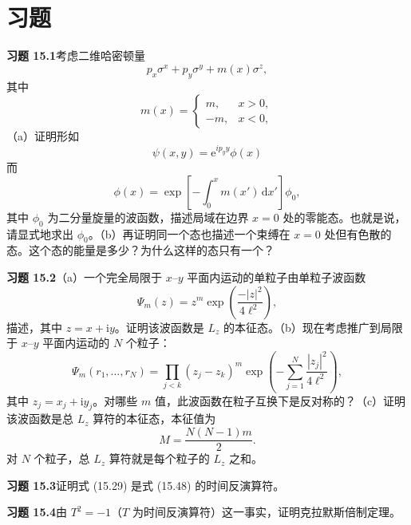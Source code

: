\section*{习题}

\textbf{习题 15.1}\quad 考虑二维哈密顿量
\begin{equation*}
p_{x}\sigma^{x}+p_{y}\sigma^{y}+m(x)\sigma^{z},\tag{15.96}
\end{equation*}
其中
\begin{equation*}
m(x)=\begin{cases}m, & x>0,\\ -m, & x<0,\end{cases}
\end{equation*}
（a）证明形如
\begin{equation*}
\psi(x,y)=\mathrm{e}^{ip_{y}y}\phi(x)\tag{15.97}
\end{equation*}
而
\begin{equation*}
\phi(x)=\exp\left[-\int_{0}^{x}m(x')\,\mathrm{d}x'\right]\phi_{0},\tag{15.98}
\end{equation*}
其中 $\phi_{0}$ 为二分量旋量的波函数，描述局域在边界 $x=0$ 处的零能态。也就是说，请显式地求出 $\phi_{0}$。（b）再证明同一个态也描述一个束缚在 $x=0$ 处但有色散的态。这个态的能量是多少？为什么这样的态只有一个？

\textbf{习题 15.2}\quad （a）一个完全局限于 $x$–$y$ 平面内运动的单粒子由单粒子波函数
\begin{equation*}
\Psi_{m}(z)=z^{m}\exp\left(\frac{-|z|^{2}}{4\ell^{2}}\right),\tag{15.99}
\end{equation*}
描述，其中 $z=x+\mathrm{i}y$。证明该波函数是 $L_{z}$ 的本征态。（b）现在考虑推广到局限于 $x$–$y$ 平面内运动的 $N$ 个粒子：
\begin{equation*}
\Psi_{m}(r_{1},\ldots,r_{N})=\prod_{j<k}(z_{j}-z_{k})^{m}\exp\left(-\sum_{j=1}^{N}\frac{|z_{j}|^{2}}{4\ell^{2}}\right),\tag{15.100}
\end{equation*}
其中 $z_{j}=x_{j}+\mathrm{i}y_{j}$。对哪些 $m$ 值，此波函数在粒子互换下是反对称的？（c）证明该波函数是总 $L_{z}$ 算符的本征态，本征值为
\begin{equation*}
M=\frac{N(N-1)m}{2}.\tag{15.101}
\end{equation*}
对 $N$ 个粒子，总 $L_{z}$ 算符就是每个粒子的 $L_{z}$ 之和。

\textbf{习题 15.3}\quad 证明式 (15.29) 是式 (15.48) 的时间反演算符。

\textbf{习题 15.4}\quad 由 $T^{2}=-1$（$T$ 为时间反演算符）这一事实，证明克拉默斯倍制定理。

